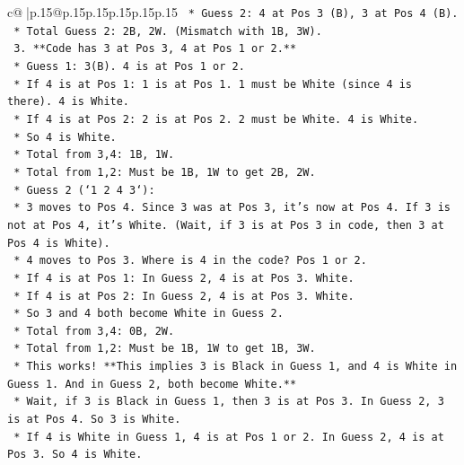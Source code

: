 \documentclass{article}
\begin{document}
{\begin{supertabular}{c@{$\;$}|p{.15\linewidth}@{}p{.15\linewidth}p{.15\linewidth}p{.15\linewidth}p{.15\linewidth}p{.15\linewidth}}
{{{\texttt{                *   Guess 2: 4 at Pos 3 (B), 3 at Pos 4 (B).} \\
\texttt{                *   Total Guess 2: 2B, 2W. (Mismatch with 1B, 3W).} \\
\texttt{            3.  **Code has 3 at Pos 3, 4 at Pos 1 or 2.**} \\
\texttt{                *   Guess 1: 3(B). 4 is at Pos 1 or 2.} \\
\texttt{                    *   If 4 is at Pos 1: 1 is at Pos 1. 1 must be White (since 4 is there). 4 is White.} \\
\texttt{                    *   If 4 is at Pos 2: 2 is at Pos 2. 2 must be White. 4 is White.} \\
\texttt{                    *   So 4 is White.} \\
\texttt{                    *   Total from 3,4: 1B, 1W.} \\
\texttt{                    *   Total from 1,2: Must be 1B, 1W to get 2B, 2W.} \\
\texttt{                *   Guess 2 (`1 2 4 3`):} \\
\texttt{                    *   3 moves to Pos 4. Since 3 was at Pos 3, it's now at Pos 4. If 3 is not at Pos 4, it's White. (Wait, if 3 is at Pos 3 in code, then 3 at Pos 4 is White).} \\
\texttt{                    *   4 moves to Pos 3. Where is 4 in the code? Pos 1 or 2.} \\
\texttt{                        *   If 4 is at Pos 1: In Guess 2, 4 is at Pos 3. White.} \\
\texttt{                        *   If 4 is at Pos 2: In Guess 2, 4 is at Pos 3. White.} \\
\texttt{                    *   So 3 and 4 both become White in Guess 2.} \\
\texttt{                    *   Total from 3,4: 0B, 2W.} \\
\texttt{                    *   Total from 1,2: Must be 1B, 1W to get 1B, 3W.} \\
\texttt{                    *   This works! **This implies 3 is Black in Guess 1, and 4 is White in Guess 1. And in Guess 2, both become White.**} \\
\texttt{                    *   Wait, if 3 is Black in Guess 1, then 3 is at Pos 3. In Guess 2, 3 is at Pos 4. So 3 is White.} \\
\texttt{                    *   If 4 is White in Guess 1, 4 is at Pos 1 or 2. In Guess 2, 4 is at Pos 3. So 4 is White.} \\
}}}
\end{supertabular}}
\end{document}
